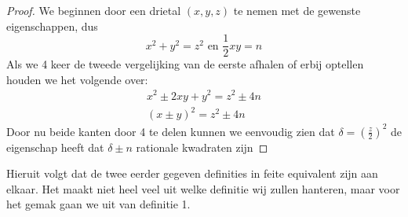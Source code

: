 \documentclass[12pt,reqno]{article}
\theoremstyle{theorem}
\theoremstyle{definition}
\begin{document}
	\begin{proof}
		We beginnen door een drietal $(x,y,z)$ te nemen met de gewenste eigenschappen, dus
		\begin{equation*}
			x^2 + y^2 = z^2 \text{ en } \frac{1}{2}xy=n
		\end{equation*}
		Als we 4 keer de tweede vergelijking van de eerste afhalen of erbij optellen houden we het volgende over:
		\begin{align*}
			x^2 \pm 2xy + y^2 = z^2 \pm 4n \\
			(x \pm y)^2 = z^2 \pm 4n
		\end{align*}
		Door nu beide kanten door 4 te delen kunnen we eenvoudig zien dat $\delta = (\frac{z}{2})^2$ de eigenschap heeft dat $\delta \pm n$ rationale kwadraten zijn
	\end{proof}
	Hieruit volgt dat de twee eerder gegeven definities in feite equivalent zijn aan elkaar. Het maakt niet heel veel uit welke definitie wij zullen hanteren, maar voor het gemak gaan we uit van definitie 1.
	
\end{document}
